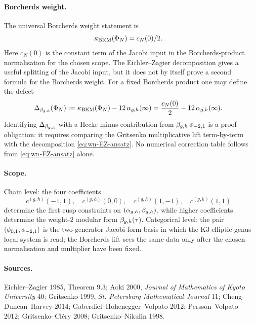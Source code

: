 \paragraph{Borcherds weight.}
The universal Borcherds weight statement is
\[
  \kappa_{\mathrm{BKM}}(\Phi_N)=c_N(0)/2.
\]
Here $c_N(0)$ is the constant term of the Jacobi input in the
Borcherds-product normalisation for the chosen scope.  The
Eichler--Zagier decomposition gives a useful splitting of the Jacobi
input, but it does not by itself prove a second formula for the
Borcherds weight.  For a fixed Borcherds product one may define the
defect
\begin{equation}
\label{eq:wn-EZ-refined-kBKM}
  \Delta_{\beta_{g,h}}(\Phi_N)
  :=
  \kappa_{\mathrm{BKM}}(\Phi_N)-12\,\alpha_{g,h}(\infty)
  =
  \frac{c_N(0)}2-12\,\alpha_{g,h}(\infty).
\end{equation}
Identifying $\Delta_{\beta_{g,h}}$ with a Hecke-minus contribution from
$\beta_{g,h}\,\phi_{-2,1}$ is a proof obligation: it requires comparing the
Gritsenko multiplicative lift term-by-term with the decomposition
\eqref{eq:wn-EZ-ansatz}.  No numerical correction table follows from
\eqref{eq:wn-EZ-ansatz} alone.

\paragraph{Scope.}
Chain level: the four coefficients
\[
  c^{(g,h)}(-1,1),\quad c^{(g,h)}(0,0),\quad
  c^{(g,h)}(1,-1),\quad c^{(g,h)}(1,1)
\]
determine the first cusp constraints on $(\alpha_{g,h},\beta_{g,h})$, while higher
coefficients determine the weight-$2$ modular form $\beta_{g,h}(\tau)$.
Categorical level: the pair $(\phi_{0,1},\phi_{-2,1})$ is the two-generator
Jacobi-form basis in which the K3 elliptic-genus local system is read;
the Borcherds lift sees the same data only after the chosen
normalisation and multiplier have been fixed.

\paragraph{Sources.}
Eichler--Zagier 1985, Theorem 9.3; Aoki 2000,
\emph{Journal of Mathematics of Kyoto University} 40; Gritsenko 1999,
\emph{St. Petersburg Mathematical Journal} 11; Cheng--Duncan--Harvey
2014; Gaberdiel--Hohenegger--Volpato 2012; Persson--Volpato 2012;
Gritsenko--Cl\'ery 2008; Gritsenko--Nikulin 1998.
